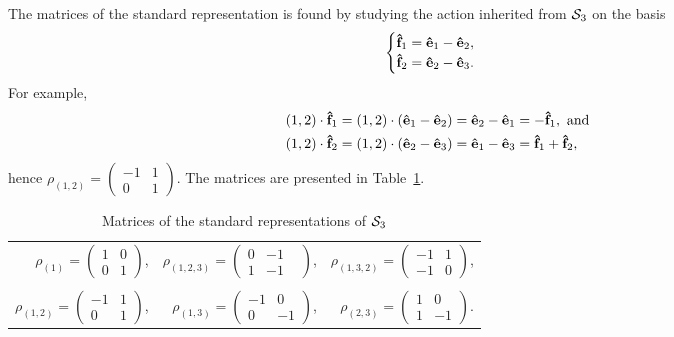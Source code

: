 \begin{example}\label{example:stdSym3}
	The matrices of the standard representation is found by studying the action inherited from $\mathcal{S}_3$ on the basis 
	\begin{align*}
		\begin{cases}
			\mathbf{\hat{f}}_1 = \mathbf{\hat{e}}_1-\mathbf{\hat{e}}_2, \\
			\mathbf{\hat{f}}_2 = \mathbf{\hat{e}}_2-\mathbf{\hat{e}}_3.
		\end{cases}
	\end{align*}
	For example, \begin{align*}
		(1,2)\cdot \mathbf{\hat{f}}_1 &= (1,2)\cdot (\mathbf{\hat{e}}_1-\mathbf{\hat{e}}_2) = \mathbf{\hat{e}}_2-\mathbf{\hat{e}}_1 = -\mathbf{\hat{f}}_1, \text{ and} \\
		(1,2)\cdot \mathbf{\hat{f}}_2 &= (1,2) \cdot (\mathbf{\hat{e}}_2-\mathbf{\hat{e}}_3) = \mathbf{\hat{e}}_1-\mathbf{\hat{e}}_3 = \mathbf{\hat{f}}_1 + \mathbf{\hat{f}}_2,
	\end{align*} hence $\rho_{(1,2)} = \left(\begin{smallmatrix}
		-1 & 1 \\ 0 & 1
	\end{smallmatrix}\right)$. The matrices are presented in Table~\ref{table:standardS3}.
	
	\begin{table}[hbt!]
		\centering
		\begin{tabular}{r r r}
			$\rho_{(1)} = 
			\begin{pmatrix}
				1 & 0 \\
				0 & 1
			\end{pmatrix}$, & 
			$\rho_{(1,2,3)} = 
			\begin{pmatrix}
				0 & -1 &\\
				1 & -1
			\end{pmatrix}$, & 
			$\rho_{(1,3,2)} = 
			\begin{pmatrix}
				-1 & 1  \\
				-1 & 0
			\end{pmatrix}$, \\ & & \\
			$\rho_{(1,2)} = 
			\begin{pmatrix}
				-1 & 1 \\
				0  & 1
			\end{pmatrix}$, &
			$\rho_{(1,3)} = 
			\begin{pmatrix}
				-1 & 0 \\
				0 & -1 
			\end{pmatrix}$, &
			$\rho_{(2,3)} = 
			\begin{pmatrix}
				1 & 0 \\
				1 & -1 
			\end{pmatrix}$.
		\end{tabular}
		\caption{Matrices of the standard representations of $\mathcal{S}_3$}
		\label{table:standardS3}
	\end{table}
\end{example}

